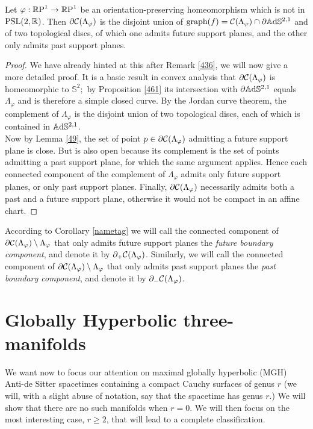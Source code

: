 \begin{corollary}\label{nametag}
    Let $\varphi:\S\to\S$ be an orientation-preserving homeomorphism which is not in $\PSL$. Then $\partial\CF$ is the disjoint union of $\text{graph}(f)=\CF\cap\partial\A^{2,1}$ and of two topological discs, of which one admits future support planes, and the other only admits past support planes. 
\end{corollary}
\begin{proof}
    We have already hinted at this after Remark \ref{436}, we will now give a more detailed proof. It is a basic result in convex analysis that $\partial\CF$ is homeomorphic to $\mathbb{S}^2;$ by Proposition \ref{461} its intersection with $\partial\A^{2,1}$ equals $\Lambda_\varphi$ and is therefore a simple closed curve. By the Jordan curve theorem, the complement of $\Lambda_\varphi$ is the disjoint union of two topological discs, each of which is contained in $\A^{2,1}$. \\
    Now by Lemma \ref{49}, the set of point $p\in\partial\CF$ admitting a future support plane is close. But is also open because its complement is the set of points admitting a past support plane, for which the same argument applies. Hence each connected component of the complement of $\Lambda_\varphi$ admits only future support planes, or only past support planes. Finally, $\partial\CF$ necessarily admits both a past and a future support plane, otherwise it would not be compact in an affine chart. 
\end{proof}

\noindent According to Corollary \ref{nametag} we will call the connected component of $\partial\CF\setminus \Lambda_\varphi$ that only admits future support planes the \textit{future boundary component}, and denote it by $\partial_+\CF$. Similarly, we will call the connected component of $\partial\CF\setminus\Lambda_\varphi$ that only admits past support planes the \textit{past boundary component}, and denote it by $\partial_-\CF$.\\

\section{Globally Hyperbolic three-manifolds}
We want now to focus our attention on maximal globally hyperbolic (MGH) Anti-de Sitter spacetimes containing a compact Cauchy surfaces of genus $r$ (we will, with a slight abuse of notation, say that the spacetime has genus $r$.) We will show that there are no such manifolds when $r=0$. We will then focus on the most interesting case, $r\geq 2$, that will lead to a complete classification.

